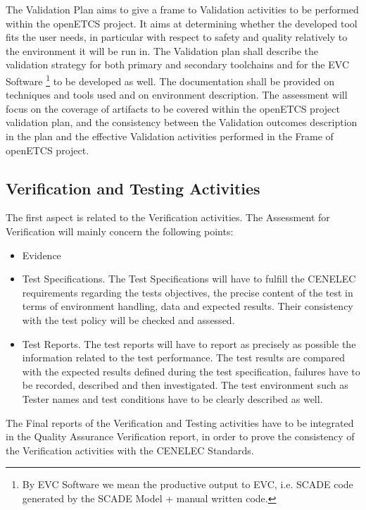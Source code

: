 \documentclass{template/openetcs_article}
\begin{document}
The Validation Plan aims to give a frame to Validation activities to be performed within the openETCS project. It aims at determining whether the developed tool
fits the user needs, in particular with respect to safety and quality relatively to the environment it will be run in.
The Validation plan shall describe the validation strategy for both primary and secondary toolchains and for the EVC Software \footnote{By EVC Software we mean the productive output to EVC, i.e. SCADE code generated by the SCADE Model + manual written code.} to be developed as well. The
documentation shall be provided on techniques and tools used and on environment description. The assessment will focus on the coverage of artifacts to be
covered within the openETCS project validation plan, and the consistency between the Validation outcomes description in the plan and the effective Validation
activities performed in the Frame of openETCS project.

\subsection{Verification and Testing Activities}
The first aspect is related to the Verification activities. The Assessment for Verification will mainly concern the following points:
\begin{itemize}
\item Evidence
\item Test Specifications. The Test Specifications will have to fulfill the CENELEC requirements regarding the tests objectives, the precise content of the test
in terms of environment handling, data and expected results. Their consistency with the test policy will be checked and assessed.
\item Test Reports. The test reports will have to report as precisely as possible the information related to the test performance. The test results are compared
with the expected results defined during the test specification, failures have to be recorded, described and then investigated. The test environment such as
Tester names and test conditions have to be clearly described as well.
\end{itemize}
The Final reports of the Verification and Testing activities have to be integrated in the Quality Assurance Verification report, in order to prove the
consistency of the Verification activities with the CENELEC Standards.
\end{document}
